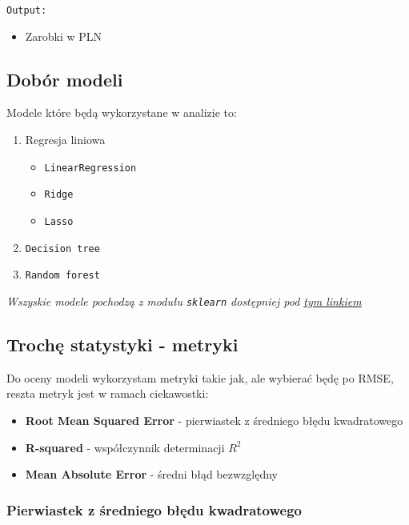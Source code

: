 \documentclass[a4paper]{article}
\begin{document}
\texttt{Output:}

\begin{itemize}
    \item Zarobki w PLN
\end{itemize}


\subsection{Dobór modeli}

\quad Modele które będą wykorzystane w analizie to:

\begin{enumerate}
    \item Regresja liniowa
          \begin{itemize}
              \item \texttt{LinearRegression}
              \item \texttt{Ridge}
              \item \texttt{Lasso}
          \end{itemize}
    \item \texttt{Decision tree}
    \item \texttt{Random forest}
\end{enumerate}

\textit{Wszyskie modele pochodzą z modułu \texttt{sklearn} dostępniej pod \href{https://scikit-learn.org/stable/}{tym linkiem}}

\subsection{Trochę statystyki - metryki}

\quad Do oceny modeli wykorzystam metryki takie jak, ale wybierać będę po RMSE, reszta metryk jest w ramach ciekawostki:

\begin{itemize}
    \item \textbf{Root Mean Squared Error} - pierwiastek z średniego błędu kwadratowego
    \item \textbf{R-squared} - współczynnik determinacji $R^2$
    \item \textbf{Mean Absolute Error} - średni błąd bezwzględny
\end{itemize}

\subsubsection{Pierwiastek z średniego błędu kwadratowego}
\end{document}
